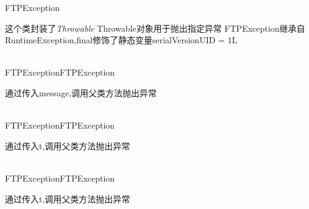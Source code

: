 \begin{XeClass}{FTPException}
   
 这个类封装了\emph{Throwable} Throwable对象用于抛出指定异常
 FTPException继承自RuntimeException,final修饰了静态变量serialVersionUID = 1L

  \begin{XeMethod}{\XePublic\\ }{FTPException}{FTPException}
       
 通过传入message,调用父类方法抛出异常

  \end{XeMethod}

  \begin{XeMethod}{\XePublic\\ }{FTPException}{FTPException}
       
 通过传入t,调用父类方法抛出异常

  \end{XeMethod}

  \begin{XeMethod}{\XePublic\\ }{FTPException}{FTPException}
       
 通过传入t,调用父类方法抛出异常

  \end{XeMethod}

\end{XeClass}
